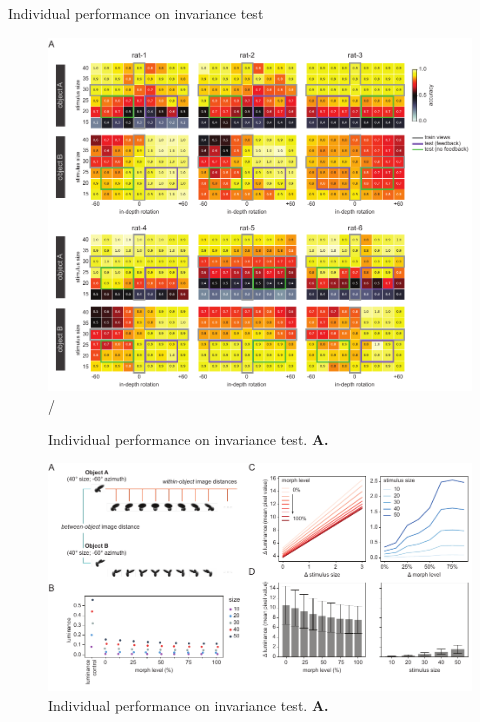 Individual performance on invariance test
\begin{figure}[t!]
\includegraphics[width=\textwidth]{figures/supplemental/fig_s3_heatmaps_per_rat/fig_s3_heatmaps_per_rat.pdf}/
    \vspace{.1in}
    \caption[Individual invariance performance]{Individual performance on invariance test.
    \textbf{A.} 
    \label{supfig:heatmaps}}
\end{figure}

\begin{figure}[t!]
\includegraphics[width=\textwidth]{figures/supplemental/fig_s4_stimulus_metrics/fig_s4_stimulus_metrics.pdf}
    \vspace{.1in}
    \caption[Individual invariance performance]{Individual performance on invariance test.
    \textbf{A.} 
    \label{supfig:stimulus_metrics}}
\end{figure}


